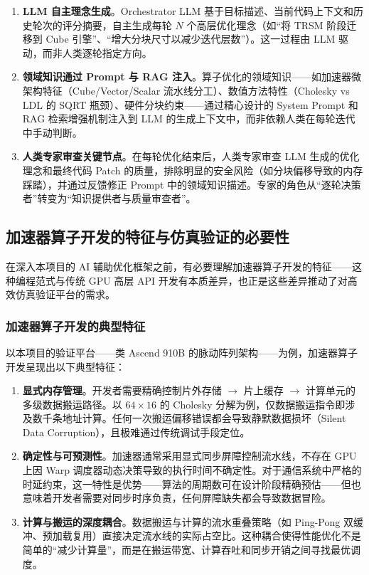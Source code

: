 \documentclass{CjC}
\begin{document}
    \begin{enumerate}
        \item \textbf{LLM 自主理念生成}。Orchestrator LLM 基于目标描述、当前代码上下文和历史轮次的评分摘要，自主生成每轮
            $N$ 个高层优化理念（如“将 TRSM 阶段迁移到 Cube 引擎”、“增大分块尺寸以减少迭代层数”）。这一过程由
            LLM 驱动，而非人类逐轮指定方向。

        \item \textbf{领域知识通过 Prompt 与 RAG 注入}。算子优化的领域知识——如加速器微架构特征（Cube/Vector/Scalar
            流水线分工）、数值方法特性（Cholesky vs LDL 的 SQRT 瓶颈）、硬件分块约束——通过精心设计的
            System Prompt 和 RAG 检索增强机制注入到 LLM 的生成上下文中，而非依赖人类在每轮迭代中手动判断。

        \item \textbf{人类专家审查关键节点}。在每轮优化结束后，人类专家审查 LLM 生成的优化理念和最终代码
            Patch 的质量，排除明显的安全风险（如分块偏移导致的内存踩踏），并通过反馈修正
            Prompt 中的领域知识描述。专家的角色从“逐轮决策者”转变为“知识提供者与质量审查者”。
    \end{enumerate}

    \subsection{加速器算子开发的特征与仿真验证的必要性}

    在深入本项目的 AI
    辅助优化框架之前，有必要理解加速器算子开发的特征——这种编程范式与传统 GPU
    高层 API 开发有本质差异，也正是这些差异推动了对高效仿真验证平台的需求。

    \subsubsection{加速器算子开发的典型特征}

    以本项目的验证平台——类 Ascend 910B
    的脉动阵列架构——为例，加速器算子开发呈现出以下典型特征：

    \begin{enumerate}
        \item \textbf{显式内存管理}。开发者需要精确控制片外存储 $\rightarrow$ 片上缓存
            $\rightarrow$ 计算单元的多级数据搬运路径。以 $64\times16$ 的 Cholesky
            分解为例，仅数据搬运指令即涉及数千条地址计算。任何一次搬运偏移错误都会导致静默数据损坏（Silent
            Data Corruption），且极难通过传统调试手段定位。

        \item \textbf{确定性与可预测性}。加速器通常采用显式同步屏障控制流水线，不存在
            GPU 上因 Warp 调度器动态决策导致的执行时间不确定性。对于通信系统中严格的时延约束，这一特性是优势——算法的周期数可在设计阶段精确预估——但也意味着开发者需要对同步时序负责，任何屏障缺失都会导致数据冒险。

        \item \textbf{计算与搬运的深度耦合}。数据搬运与计算的流水重叠策略（如 Ping-Pong
            双缓冲、预加载复用）直接决定流水线的实际占空比。这种耦合使得性能优化不是简单的“减少计算量”，而是在搬运带宽、计算吞吐和同步开销之间寻找最优调度。
    \end{enumerate}
\end{document}

